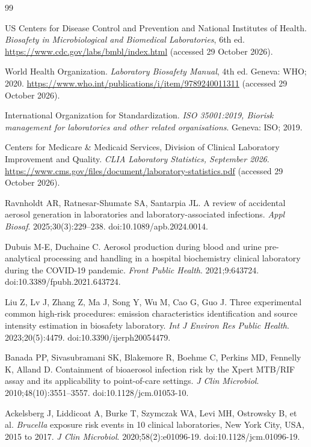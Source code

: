 \begin{thebibliography}{99}
\footnotesize
\setlength{\itemsep}{1.5pt}

US Centers for Disease Control and Prevention and National Institutes of Health.
\textit{Biosafety in Microbiological and Biomedical Laboratories}, 6th ed.
\url{https://www.cdc.gov/labs/bmbl/index.html} (accessed 29 October 2026).

World Health Organization. \textit{Laboratory Biosafety Manual}, 4th ed. Geneva: WHO;
2020. \url{https://www.who.int/publications/i/item/9789240011311} (accessed 29 October
2026).

International Organization for Standardization. \textit{ISO 35001:2019, Biorisk management
for laboratories and other related organisations}. Geneva: ISO; 2019.

Centers for Medicare \& Medicaid Services, Division of Clinical Laboratory Improvement and
Quality. \textit{CLIA Laboratory Statistics, September 2026}.
\url{https://www.cms.gov/files/document/laboratory-statistics.pdf} (accessed 29 October
2026).

Ravnholdt AR, Ratnesar-Shumate SA, Santarpia JL. A review of accidental aerosol generation
in laboratories and laboratory-associated infections. \textit{Appl Biosaf}.
2025;30(3):229--238. doi:10.1089/apb.2024.0014.

Dubuis M-E, Duchaine C. Aerosol production during blood and urine pre-analytical
processing and handling in a hospital biochemistry clinical laboratory during the COVID-19
pandemic. \textit{Front Public Health}. 2021;9:643724. doi:10.3389/fpubh.2021.643724.

Liu Z, Lv J, Zhang Z, Ma J, Song Y, Wu M, Cao G, Guo J. Three experimental common
high-risk procedures: emission characteristics identification and source intensity
estimation in biosafety laboratory. \textit{Int J Environ Res Public Health}.
2023;20(5):4479. doi:10.3390/ijerph20054479.

Banada PP, Sivasubramani SK, Blakemore R, Boehme C, Perkins MD, Fennelly K, Alland D.
Containment of bioaerosol infection risk by the Xpert MTB/RIF assay and its applicability
to point-of-care settings. \textit{J Clin Microbiol}. 2010;48(10):3551--3557.
doi:10.1128/jcm.01053-10.

Ackelsberg J, Liddicoat A, Burke T, Szymczak WA, Levi MH, Ostrowsky B, et al.
\textit{Brucella} exposure risk events in 10 clinical laboratories, New York City, USA,
2015 to 2017. \textit{J Clin Microbiol}. 2020;58(2):e01096-19. doi:10.1128/jcm.01096-19.


\end{thebibliography}
